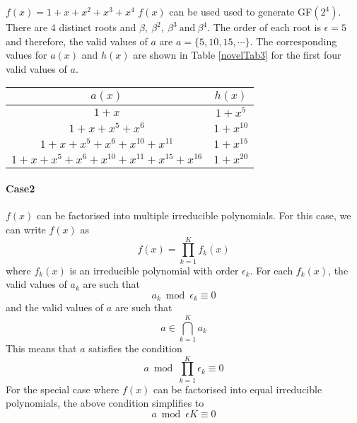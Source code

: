 \begin{example}
$f(x)=1+x+x^2+x^3+x^4$\newline
$f(x)$ can be used used to generate GF$(2^4)$. There are 4 distinct roots and $\beta,~\beta^2,~\beta^3~\text{and}~\beta^4$. The order of each root is $\epsilon=5$ and therefore, the valid values of $a$ are $a=\{5,10,15,\cdots\}$. The corresponding values for $a(x)$ and $h(x)$ are shown in Table \ref{novelTab3} for the first four valid values of $a$.
\begin{table*}[h!]
\caption{$f(x)=1+x+x^2+x^3+x^4$}
\centering
\begin{tabular}{c c} 
 \hline
 $a(x)$ & $h(x)$  \\ [0.5ex] 
 \hline\hline
$1+x$ &$1+x^5$\\ 
$1+x+x^5+x^6$ &$1+x^{10}$  \\
$1+x+x^5+x^6+x^{10}+x^{11}$ & $1+x^{15}$ \\
$1+x+x^5+x^6+x^{10}+x^{11}+x^{15}+x^{16}$ &$1+x^{20}$  
 \end{tabular}
 \label{novelTab3}
\end{table*}
\end{example}


\paragraph{Case2}$f(x)$ can be factorised into multiple irreducible polynomials. \newline
For this case, we can write $f(x)$ as $$f(x)=\prod_{k=1}^{K}f_k(x)$$ where $f_k(x)$ is an irreducible polynomial with order $\epsilon_k$. 
For each $f_k(x)$, the valid values of  $a_k$ are such that 
$$a_k \bmod \epsilon_k \equiv 0$$ and the valid values of $a$ are such that
$$a \in  \bigcap_{k=1}^{K} a_k$$
This means that $a$ satisfies the condition
$$ a \bmod  \prod_{k=1}^{K} \epsilon_k \equiv 0$$
For the special case where $f(x)$ can be factorised into equal irreducible polynomials, the above condition simplifies to 
$$a \bmod \epsilon K \equiv 0$$

